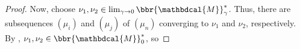 \documentclass{article}
\theoremstyle{plain}
\theoremstyle{definition}
\theoremstyle{remark}
\newcommand{\dg}[1]{\mathbdcal{#1}}
\newcommand\Inc{\mathit{Inc}}
\numberwithin{equation}{section}
\begin{document}
\begin{proof}
%
Now, choose $\nu_1, \nu_2  \in  \lim_{\gamma\to0}\bbr{\dg
  M}_\gamma^*$. 
Thus, there are subsequences $(\mu_{i})$ and $(\mu_{j})$ of
$(\mu_n)$ converging
to $\nu_1$ and $\nu_2$, respectively.
By , $\nu_1, \nu_2 \in \bbr{\dg M}_0^*$, so

\end{proof}
\end{document}
